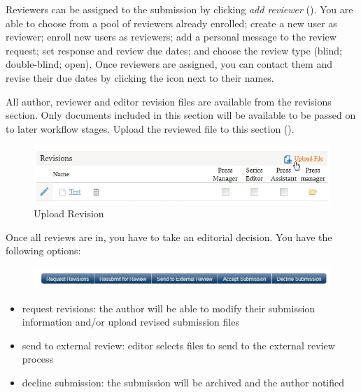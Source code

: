 Reviewers can be assigned to the submission by clicking \textit{add reviewer} (). You are able to choose from a pool of reviewers already enrolled; create a new user as reviewer; enroll new users as reviewers; add a personal message to the review request; set response and review due dates; and choose the review type (blind; double-blind; open). Once reviewers are assigned, you can contact them and revise their due dates by clicking the icon next to their names. %

All author, reviewer and editor revision files are available from the revisions section. Only documents included in this section will be available to be passed on to later workflow stages. Upload the reviewed file to this section ().

\begin{figure}[h] \centering
\includegraphics[width=1\textwidth]{./img/uploadRevision.jpg} \caption{Upload Revision}
\label{fig:uploadRevision}
\end{figure}

 

Once all reviews are in, you have to take an editorial decision. You have the following options: 
\begin{figure}[h] \centering
\includegraphics[width=1\textwidth]{./img/internalReview-2.jpg} 
\end{figure}
\begin{itemize}[noitemsep]
\item request revisions: the author will be able to modify their submission information and/or upload revised submission files
\item send to external review: editor selects files to send to the external review process
\item decline submission: the submission will be archived and the author notified
\end{itemize}

